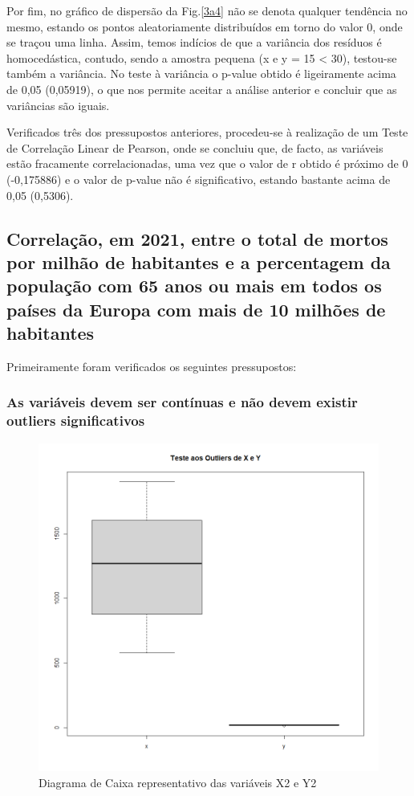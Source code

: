 \documentclass[conference]{IEEEtran}
\begin{document}
Por fim, no gráfico de dispersão da Fig.\ref{3a4} não se denota qualquer tendência no mesmo, estando os pontos aleatoriamente distribuídos em torno do valor 0, onde se traçou uma linha. Assim, temos indícios de que a variância dos resíduos é homocedástica, contudo, sendo a amostra pequena (x e y = 15 < 30), testou-se também a variância. No teste à variância o p-value obtido é ligeiramente acima de 0,05 (0,05919), o que nos permite aceitar a análise anterior e concluir que as variâncias são iguais.

Verificados três dos pressupostos anteriores, procedeu-se à realização de um Teste de Correlação Linear de Pearson, onde se concluiu que, de facto, as variáveis estão fracamente correlacionadas, uma vez que o valor de r obtido é próximo de 0 (-0,175886) e o valor de p-value não é significativo, estando bastante acima de 0,05 (0,5306).

\subsection{Correlação, em 2021, entre o total de mortos por milhão de habitantes e a percentagem da população com 65 anos ou mais em todos os países da Europa com mais de 10 milhões de habitantes}

Primeiramente foram verificados os seguintes pressupostos:

\subsubsection{As variáveis devem ser contínuas e não devem existir outliers significativos}

\begin{figure}[htbp]
\centerline{\includegraphics[width=0.95\columnwidth]{images/03.b.1.png}}
\caption{Diagrama de Caixa representativo das variáveis X2 e Y2}
\label{3b1}
\end{figure}
\end{document}
